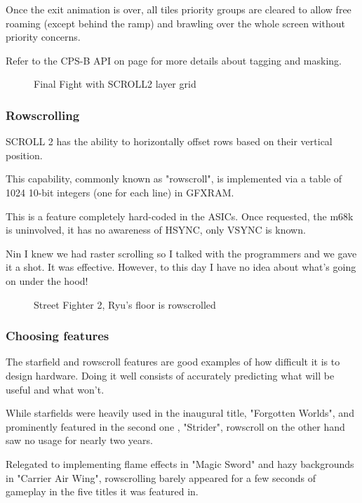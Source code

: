 Once the exit animation is over, all tiles priority groups are cleared to allow free roaming (except behind the ramp) and brawling over the whole screen without priority concerns.

Refer to the CPS-B API on page \pageref{cpsbreg_programming} for more details about tagging and masking.
\vfill
\begin{figure}[!b]
 \caption*{Final Fight with SCROLL2 layer grid}%
 \end{figure}%
\pagebreak

\subsubsection{Rowscrolling}
SCROLL 2 has the ability to horizontally offset rows based on their vertical position. 

This capability, commonly known as "rowscroll", is implemented via a table of 1024 10-bit integers (one for each line) in GFXRAM.

This is a feature completely hard-coded in the ASICs. Once requested, the m68k is uninvolved, it has no awareness of HSYNC, only VSYNC is known.

\begin{q}{Nin}
I knew we had raster scrolling so I talked with the programmers and we gave it a shot.  It was effective. However, to this day I have no idea about what's going on under the hood!
\end{q}

\vfill
\begin{figure}[!b]
 \caption*{Street Fighter 2, Ryu's floor is rowscrolled}%
 \end{figure}%
\pagebreak

\subsubsection{Choosing features}

The starfield and rowscroll features are good examples of how difficult it is to design hardware. Doing it well consists of accurately predicting what will be useful and what won't. 

While starfields were heavily used in the inaugural title, "Forgotten Worlds", and prominently featured in the second one , "Strider", rowscroll on the other hand saw no usage for nearly two years. 

Relegated to implementing flame effects in "Magic Sword" and hazy backgrounds in "Carrier Air Wing", rowscrolling barely appeared for a few seconds of gameplay in the five titles\cite{mame_cps1_video} it was featured in.

